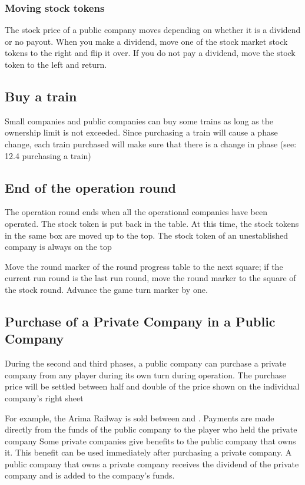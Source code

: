 \documentclass{article}
\begin{document}
\begin{CJK}{UTF8}{min}
\subsubsection{Moving stock tokens}
The stock price of a public company moves depending on whether it is a
dividend or no payout. When you make a dividend, move one of the stock
market stock tokens to the right and flip it over. If you do not pay a
dividend, move the stock token to the left and return.

\subsection{Buy a train}
Small companies and public companies can buy some trains as long as
the ownership limit is not exceeded. Since purchasing a train will
cause a phase change, each train purchased will make sure that there
is a change in phase (see: 12.4 purchasing a train)

\subsection{End of the operation round}
The operation round ends when all the operational companies have been
operated. The stock token is put back in the table. At this time, the
stock tokens in the same box are moved up to the top. The stock token
of an unestablished company is always on the top

Move the round marker of the round progress table to the next square;
if the current run round is the last run round, move the round marker
to the square of the stock round. Advance the game turn marker by one.

\subsection{Purchase of a Private Company in a Public Company}
During the second and third phases, a public company can purchase a
private company from any player during its own turn during
operation. The purchase price will be settled between half and double
of the price shown on the individual company's right sheet

For example, the  Arima Railway is sold between  and
. Payments are made directly from the funds of the public
company to the player who held the private company Some private
companies give benefits to the public company that owns it. This
benefit can be used immediately after purchasing a private company. A
public company that owns a private company receives the dividend of
the private company and is added to the company's funds.


\end{CJK}
\end{document}
